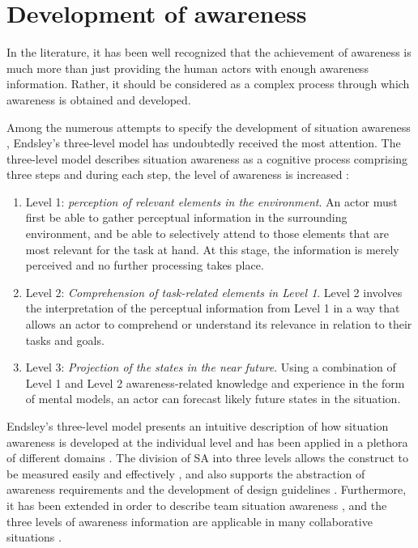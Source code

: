 \section{Development of awareness} %
\label{sec:development_of_awareness}
In the literature, it has been well recognized that the achievement of awareness is much more than just providing the human actors with enough awareness information. Rather, it should be considered as a complex process through which awareness is obtained and developed. 

Among the numerous attempts to specify the development of situation awareness \cite{Salmon2008}, Endsley's three-level model \cite{Endsley1995} has undoubtedly received the most attention. The three-level model describes situation awareness as a cognitive process comprising three steps and during each step, the level of awareness is increased \cite{Endsley1995}:

\begin{enumerate}
   \item Level 1: \emph{perception of relevant elements in the environment}. An actor must first be able to gather perceptual information in the surrounding environment, and be able to selectively attend to those elements that are most relevant for the task at hand. At this stage, the information is merely perceived and no further processing takes place. 
   \item Level 2: \emph{Comprehension of task-related elements in Level 1}. Level 2 involves the interpretation of the perceptual information from Level 1 in a way that allows an actor to comprehend or understand its relevance in relation to their tasks and goals.
   \item Level 3: \emph{Projection of the states in the near future}. Using a combination of Level 1 and Level 2 awareness-related knowledge and experience in the form of mental models, an actor can forecast likely future states in the situation.
\end{enumerate}

Endsley's three-level model presents an intuitive description of how situation awareness is developed at the individual level and has been applied in a plethora of different domains \cite{Wickens2008}. The division of SA into three levels allows the construct to be measured easily and effectively \cite{endsley1995measurement}, and also supports the abstraction of awareness requirements and the development of design guidelines \cite{Salmon2008}. Furthermore, it has been extended in order to describe team situation awareness \cite{endsley2001model}, and the three levels of awareness information are applicable in many collaborative situations \cite{Gutwin2002}.

